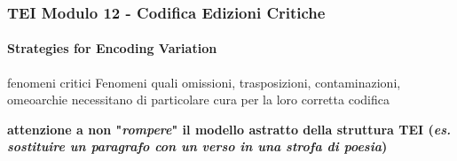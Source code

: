 \begin{frame}
    \frametitle{TEI Modulo 12 - Codifica Edizioni Critiche}
    \framesubtitle{Strategies for Encoding Variation}
    \addtocounter{nframe}{1}
    



    \begin{block}{fenomeni critici}
       Fenomeni quali omissioni, trasposizioni, contaminazioni, omeoarchie necessitano di particolare cura per la loro corretta codifica
    \end{block}
    \textbf{attenzione a non "\textit{rompere}" il modello astratto della struttura TEI (\textit{es. sostituire un paragrafo con un verso in una strofa di poesia})}

\end{frame}

